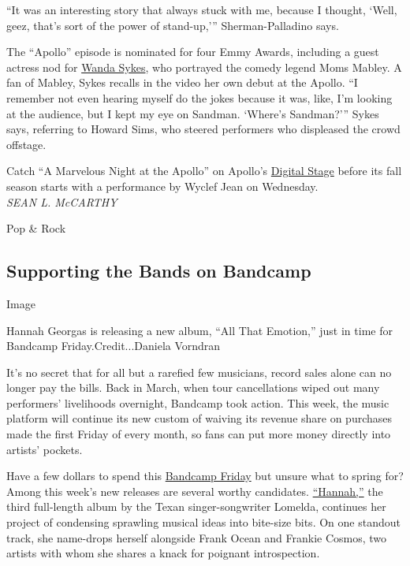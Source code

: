 ``It was an interesting story that always stuck with me, because I
thought, `Well, geez, that's sort of the power of stand-up,'''
Sherman-Palladino says.

The ``Apollo'' episode is nominated for four Emmy Awards, including a
guest actress nod for \href{https://www.wandasykes.com/}{Wanda Sykes},
who portrayed the comedy legend Moms Mabley. A fan of Mabley, Sykes
recalls in the video her own debut at the Apollo. ``I remember not even
hearing myself do the jokes because it was, like, I'm looking at the
audience, but I kept my eye on Sandman. `Where's Sandman?''' Sykes says,
referring to Howard Sims, who steered performers who displeased the
crowd offstage.

Catch ``A Marvelous Night at the Apollo'' on Apollo's
\href{https://www.apollotheater.org/digitalstage/}{Digital Stage} before
its fall season starts with a performance by Wyclef Jean on Wednesday.\\
\emph{SEAN L. McCARTHY}

Pop \& Rock

\hypertarget{supporting-the-bands-on-bandcamp}{%
\subsection{Supporting the Bands on
Bandcamp}\label{supporting-the-bands-on-bandcamp}}

Image

Hannah Georgas is releasing a new album, ``All That Emotion,'' just in
time for Bandcamp Friday.Credit...Daniela Vorndran

It's no secret that for all but a rarefied few musicians, record sales
alone can no longer pay the bills. Back in March, when tour
cancellations wiped out many performers' livelihoods overnight, Bandcamp
took action. This week, the music platform will continue its new custom
of waiving its revenue share on purchases made the first Friday of every
month, so fans can put more money directly into artists' pockets.

Have a few dollars to spend this
\href{https://daily.bandcamp.com/features/update-on-bandcamp-fridays}{Bandcamp
Friday} but unsure what to spring for? Among this week's new releases
are several worthy candidates.
\href{https://lomelda.bandcamp.com/album/hannah}{``Hannah,''} the third
full-length album by the Texan singer-songwriter Lomelda, continues her
project of condensing sprawling musical ideas into bite-size bits. On
one standout track, she name-drops herself alongside Frank Ocean and
Frankie Cosmos, two artists with whom she shares a knack for poignant
introspection.

